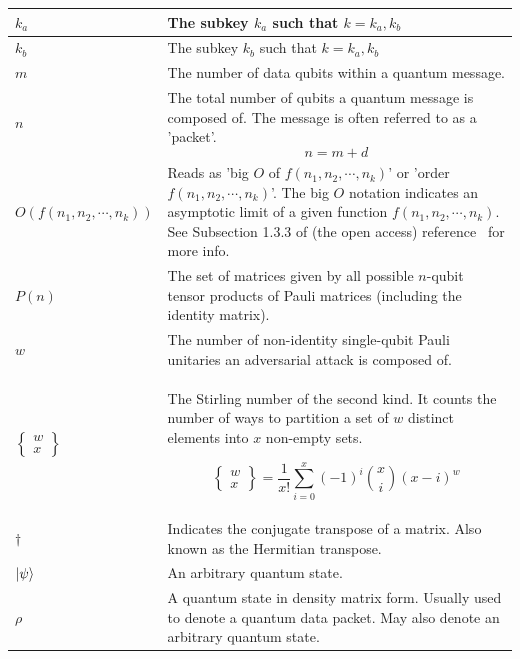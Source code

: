 \begin{xltabular}{\linewidth}{ l | X }
$k_a$ & The subkey $k_a$ such that $k = k_a,k_b$
\\ \hline

$k_b$ & The subkey $k_b$ such that $k = k_a,k_b$
\\ \hline

$m$ & The number of data qubits within a quantum message.
\\ \hline

$n$ & The total number of qubits a quantum message is composed of. The message is often referred to as a 'packet'.
$$n = m + d$$
\\ \hline

$O\left(f(n_1,n_2, \cdots ,n_k)\right)$ & Reads as 'big $O$ of $f(n_1,n_2, \cdots ,n_k)$' or 'order $f(n_1,n_2, \cdots ,n_k)$'. The big $O$ notation indicates an asymptotic limit of a given function $f(n_1,n_2, \cdots ,n_k)$. See Subsection 1.3.3 of (the open access) reference~\cite{morin2013open} for more info.
\\ \hline

$P(n)$ & The set of matrices given by all possible $n$-qubit tensor products of Pauli matrices (including the identity matrix).
\\ \hline

$w$ & The number of non-identity single-qubit Pauli unitaries an adversarial attack is composed of. 
\\ \hline

$\left\{\begin{smallmatrix}w\\x\end{smallmatrix}\right\}$ & The Stirling number of the second kind. It counts the number of ways to partition a set of $w$ distinct elements into $x$ non-empty sets.

\begin{equation}
\left\{\begin{smallmatrix}w\\x\end{smallmatrix}\right\} = \frac{1}{x !} \sum_{i=0}^{x}(-1)^{i}{x \choose i}(x-i)^{w}
\end{equation}
\\ \hline 

$\dagger$ & Indicates the conjugate transpose of a matrix. Also known as the Hermitian transpose.
\\ \hline

$\ket{\psi}$ & An arbitrary quantum state.
\\ \hline

$\rho$ & A quantum state in density matrix form. Usually used to denote a quantum data packet. May also denote an arbitrary quantum state.
\\ \hline


\end{xltabular}
